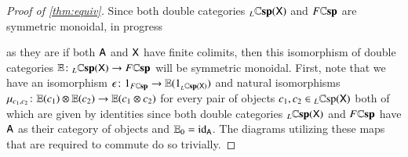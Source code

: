 \documentclass[reqno]{amsart}
\begin{document}
\begin{proof}[Proof of \cref{thm:equiv}]
Since both double categories $_L \mathbf{\mathbb Csp}(\mathsf{X})$ and $F\mathbf{\mathbb Csp}$ are symmetric monoidal, 
{\chris in progress}

as they are if both $\mathsf{A}$ and $\mathsf{X}$ have finite colimits, then this isomorphism of double categories $\mathbb{E} \colon _L \mathbf{\mathbb Csp}(\mathsf{X}) \to F\mathbf{\mathbb Csp}$ will be symmetric monoidal. First, note that we have an isomorphism $\epsilon \colon 1_{F\mathbf{\mathbb Csp}} \to \mathbb{E}(1_{_L \mathbf{\mathbb Csp}(\mathsf{X})})$ and natural isomorphisms $\mu_{c_1,c_2} \colon \mathbb{E}(c_1) \otimes \mathbb{E}(c_2) \to \mathbb{E}(c_1 \otimes c_2)$ for every pair of objects $c_1,c_2 \in {_L \mathbb{C} \textnormal{sp}(\mathsf{X})}$ both of which are given by identities since both double categories $_L \mathbf{\mathbb Csp}(\mathsf{X})$ and $F\mathbf{\mathbb Csp}$ have $\mathsf{A}$ as their category of objects and $\mathbb{E}_0=\mathrm{id}_{\mathsf{A}}$. The diagrams utilizing these maps that are required to commute do so trivially.


\end{proof}
\end{document}
